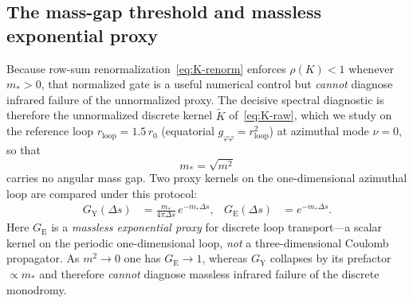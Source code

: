 \documentclass{iopjournal}
\theoremstyle{remark}
\begin{document}
\subsection{The mass-gap threshold and massless exponential proxy}
\label{sec:mass-gap}

Because row-sum renormalization~\eqref{eq:K-renorm} enforces $\rho(K)<1$ whenever $m_{\ast}>0$, that normalized gate is a useful numerical control but \emph{cannot} diagnose infrared failure of the unnormalized proxy.
The decisive spectral diagnostic is therefore the unnormalized discrete kernel $\widetilde{K}$ of~\eqref{eq:K-raw}, which we study on the reference loop $r_{\mathrm{loop}}=1.5\,r_{0}$ (equatorial $g_{\varphi\varphi}=r_{\mathrm{loop}}^{2}$) at azimuthal mode $\nu=0$, so that
\begin{equation}
\label{eq:m-star-nu0}
m_{\ast}=\sqrt{m^{2}}
\end{equation}
carries no angular mass gap.
Two proxy kernels on the one-dimensional azimuthal loop are compared under this protocol:
\begin{align}
\label{eq:kernels-path3}
G_{\mathrm{Y}}(\Delta s)
&=
\frac{m_{\ast}}{4\pi\Delta s}\,e^{-m_{\ast}\Delta s},
&
G_{\mathrm{E}}(\Delta s)
&=
e^{-m_{\ast}\Delta s}.
\end{align}
Here $G_{\mathrm{E}}$ is a \emph{massless exponential proxy} for discrete loop transport---a scalar kernel on the periodic one-dimensional loop, \emph{not} a three-dimensional Coulomb propagator.
As $m^{2}\to 0$ one has $G_{\mathrm{E}}\to 1$, whereas $G_{\mathrm{Y}}$ collapses by its prefactor $\propto m_{\ast}$ and therefore \emph{cannot} diagnose massless infrared failure of the discrete monodromy.
\end{document}
